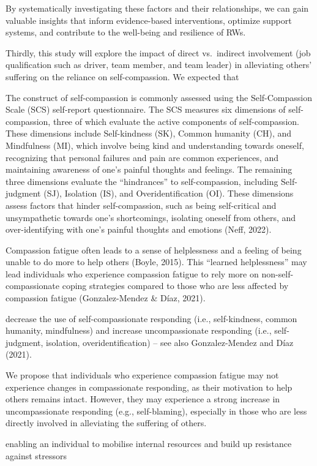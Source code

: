 \documentclass[
  man]{apa6}
\begin{document}
By systematically investigating these factors and their relationships, we can gain valuable insights that inform evidence-based interventions, optimize support systems, and contribute to the well-being and resilience of RWs.

Thirdly, this study will explore the impact of direct vs.~indirect involvement (job qualification such as driver, team member, and team leader) in alleviating others' suffering on the reliance on self-compassion. We expected that

The construct of self-compassion is commonly assessed using the Self-Compassion Scale (SCS) self-report questionnaire. The SCS measures six dimensions of self-compassion, three of which evaluate the active components of self-compassion. These dimensions include Self-kindness (SK), Common humanity (CH), and Mindfulness (MI), which involve being kind and understanding towards oneself, recognizing that personal failures and pain are common experiences, and maintaining awareness of one's painful thoughts and feelings. The remaining three dimensions evaluate the ``hindrances'' to self-compassion, including Self-judgment (SJ), Isolation (IS), and Overidentification (OI). These dimensions assess factors that hinder self-compassion, such as being self-critical and unsympathetic towards one's shortcomings, isolating oneself from others, and over-identifying with one's painful thoughts and emotions (Neff, 2022).

Compassion fatigue often leads to a sense of helplessness and a feeling of being unable to do more to help others (Boyle, 2015). This ``learned helplessness'' may lead individuals who experience compassion fatigue to rely more on non-self-compassionate coping strategies compared to those who are less affected by compassion fatigue (Gonzalez-Mendez \& Díaz, 2021).

decrease the use of self-compassionate responding (i.e., self-kindness, common humanity, mindfulness) and increase uncompassionate responding (i.e., self-judgment, isolation, overidentification) -- see also Gonzalez-Mendez and Díaz (2021).

We propose that individuals who experience compassion fatigue may not experience changes in compassionate responding, as their motivation to help others remains intact. However, they may experience a strong increase in uncompassionate responding (e.g., self-blaming), especially in those who are less directly involved in alleviating the suffering of others.

enabling an individual to mobilise internal resources and build up resistance against stressors
\end{document}
